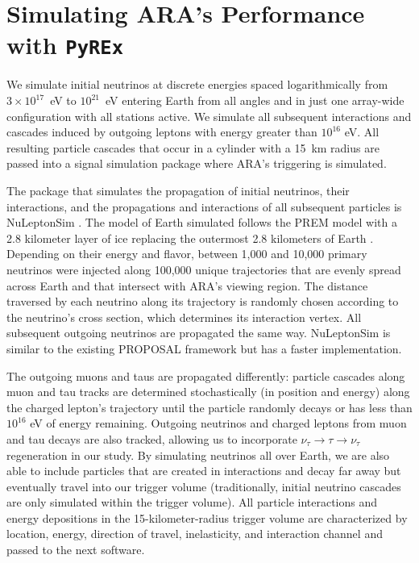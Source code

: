 \chapter{Simulating ARA's Performance with \texttt{PyREx} \label{app:veff_pyrex}}

  We simulate initial neutrinos at discrete energies spaced logarithmically from $3\times10^{17}$~eV to $10^{21}$~eV entering Earth from all angles and in just one array-wide configuration with all stations active.
  We simulate all subsequent interactions and cascades induced by outgoing leptons with energy greater than $10^{16}$ eV.
  All resulting particle cascades that occur in a cylinder with a 15~km radius are passed into a signal simulation package where ARA's triggering is simulated.

  The package that simulates the propagation of initial neutrinos, their interactions, and the propagations and interactions of all subsequent particles is NuLeptonSim \citep{nuleptonsim}.
  The model of Earth simulated follows the PREM model with a 2.8 kilometer layer of ice replacing the outermost 2.8 kilometers of Earth \citep{prem}.
  Depending on their energy and flavor, between 1,000 and 10,000 primary neutrinos were injected along 100,000 unique trajectories that are evenly spread across Earth and that intersect with ARA's viewing region.
  The distance traversed by each neutrino along its trajectory is randomly chosen according to the neutrino's cross section, which determines its interaction vertex.
  All subsequent outgoing neutrinos are propagated the same way.
  NuLeptonSim is similar to the existing PROPOSAL framework but has a faster implementation.

  The outgoing muons and taus are propagated differently: particle cascades along muon and tau tracks are determined stochastically (in position and energy) along the charged lepton's trajectory until the particle randomly decays or has less than $10^{16}$ eV of energy remaining.
  Outgoing neutrinos and charged leptons from muon and tau decays are also tracked, allowing us to incorporate $\nu_{\tau}\to\tau\to\nu_{\tau}$ regeneration in our study.
  By simulating neutrinos all over Earth, we are also able to include particles that are created in interactions and decay far away but eventually travel into our trigger volume (traditionally, initial neutrino cascades are only simulated within the trigger volume).
  All particle interactions and energy depositions in the 15-kilometer-radius trigger volume are characterized by location, energy, direction of travel, inelasticity, and interaction channel and passed to the next software.

